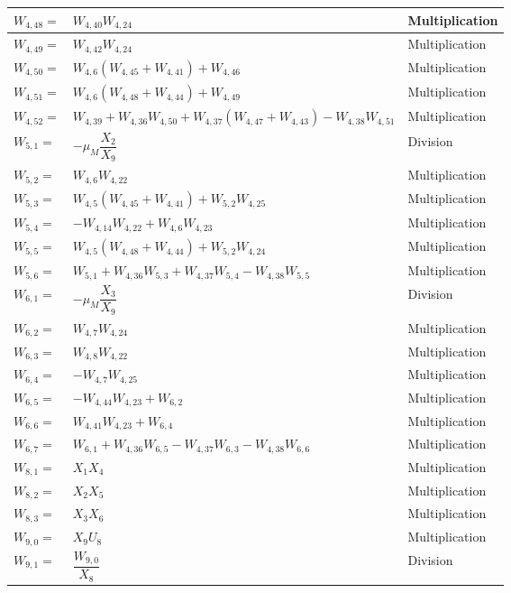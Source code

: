 \begin{longtable}{|p{1.5cm}|l|p{2cm}|}
$W_{4,48}=$ & $ W_{4,40}W_{4,24} $ & Multiplication \\ \hline
$W_{4,49}=$ & $ W_{4,42}W_{4,24} $ & Multiplication \\ \hline
$W_{4,50}=$ & $ W_{4,6}\left(W_{4,45}+W_{4,41} \right) + W_{4,46} $ & Multiplication \\ \hline
$W_{4,51}=$ & $ W_{4,6}\left(W_{4,48}+W_{4,44} \right) + W_{4,49} $ & Multiplication \\ \hline
$W_{4,52}=$ & $ W_{4,39} +W_{4,36}W_{4,50}+W_{4,37}\left(W_{4,47}+W_{4,43}\right)-W_{4,38}W_{4,51} $ & Multiplication \\ \hline
$W_{5,1}=$ & $-\mu_{M}\dfrac{X_{2}}{X_{9}}  $ & Division \\ \hline
$W_{5,2}=$ & $ W_{4,6}W_{4,22} $ & Multiplication \\ \hline
$W_{5,3}=$ & $ W_{4,5} \left(W_{4,45}+W_{4,41}\right) +W_{5,2} W_{4,25} $ & Multiplication \\ \hline
$W_{5,4}=$ & $ -W_{4,14}W_{4,22}+W_{4,6}W_{4,23} $ & Multiplication \\ \hline
$W_{5,5}=$ & $ W_{4,5} \left(W_{4,48}+W_{4,44}\right)+W_{5,2}W_{4,24} $ & Multiplication \\ \hline
$W_{5,6}=$ & $ W_{5,1} + W_{4,36}W_{5,3}+W_{4,37}W_{5,4}-W_{4,38}W_{5,5} $ & Multiplication \\ \hline
$W_{6,1}=$ & $ -\mu_{M}\dfrac{X_{3}}{X_{9}} $ & Division \\ \hline
$W_{6,2}=$ & $ W_{4,7}W_{4,24} $ & Multiplication \\ \hline
$W_{6,3}=$ & $ W_{4,8}W_{4,22} $ & Multiplication \\ \hline
$W_{6,4}=$ & $ -W_{4,7}W_{4,25} $ & Multiplication \\ \hline
$W_{6,5}=$ & $ -W_{4,44}W_{4,23}+W_{6,2} $ & Multiplication \\ \hline
$W_{6,6}=$ & $ W_{4,41}W_{4,23}+W_{6,4} $ & Multiplication \\ \hline
$W_{6,7}=$ & $ W_{6,1} + W_{4,36}W_{6,5}-W_{4,37}W_{6,3}-W_{4,38}W_{6,6} $ & Multiplication \\ \hline
$W_{8,1}=$ & $ X_{1}X_{4} $ & Multiplication \\ \hline
$W_{8,2}=$ & $ X_{2}X_{5} $ & Multiplication \\ \hline
$W_{8,3}=$ & $ X_{3}X_{6} $ & Multiplication \\ \hline
$W_{9,0}=$ & $ X_{9}U_{8} $ & Multiplication \\ \hline
$W_{9,1}=$ & $ \dfrac{W_{9,0}}{X_{8}} $ & Division \\ \hline

\end{longtable}
